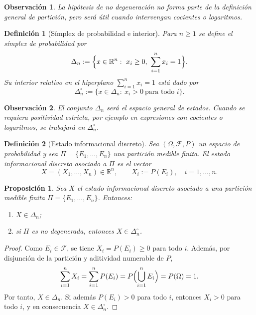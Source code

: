 \documentclass[12pt]{article}
\newtheorem{definicion}{Definición}[section]
\newtheorem{proposicion}{Proposición}[section]
\newtheorem{observacion}{Observación}[section]
\begin{document}
\begin{observacion}
La hipótesis de no degeneración no forma parte de la definición general de partición, pero será útil cuando intervengan cocientes o logaritmos.
\end{observacion}

\begin{definicion}[Símplex de probabilidad e interior]\label{def:simplex}
Para $n\ge 1$ se define el \emph{símplex de probabilidad} por
\[
\Delta_n:=\Bigl\{x\in\mathbb R^n:\ x_i\ge 0,\ \sum_{i=1}^n x_i=1\Bigr\}.
\]
Su interior relativo en el hiperplano $\sum_{i=1}^n x_i=1$ está dado por
\[
\Delta_n^\circ:=\{x\in\Delta_n:\ x_i>0\ \text{para todo } i\}.
\]
\end{definicion}

\begin{observacion}
El conjunto $\Delta_n$ será el espacio general de estados. Cuando se requiera positividad estricta, por ejemplo en expresiones con cocientes o logaritmos, se trabajará en $\Delta_n^\circ$.
\end{observacion}

\begin{definicion}[Estado informacional discreto]\label{def:estado}
Sea $(\Omega,\mathcal F,P)$ un espacio de probabilidad y sea $\Pi=\{E_1,\dots,E_n\}$ una partición medible finita. El \emph{estado informacional discreto} asociado a $\Pi$ es el vector
\[
X=(X_1,\dots,X_n)\in\mathbb R^n,
\qquad
X_i:=P(E_i),\quad i=1,\dots,n.
\]
\end{definicion}

\begin{proposicion}\label{prop:estado_simplex}
Sea $X$ el estado informacional discreto asociado a una partición medible finita $\Pi=\{E_1,\dots,E_n\}$.
Entonces:
\begin{enumerate}
    \item $X\in\Delta_n$;
    \item si $\Pi$ es no degenerada, entonces $X\in\Delta_n^\circ$.
\end{enumerate}
\end{proposicion}

\begin{proof}
Como $E_i\in\mathcal F$, se tiene $X_i=P(E_i)\ge 0$ para todo $i$. Además, por disjunción de la partición y aditividad numerable de $P$,
\[
\sum_{i=1}^n X_i
=
\sum_{i=1}^n P(E_i)
=
P\Bigl(\bigcup_{i=1}^n E_i\Bigr)
=
P(\Omega)
=
1.
\]
Por tanto, $X\in\Delta_n$. Si además $P(E_i)>0$ para todo $i$, entonces $X_i>0$ para todo $i$, y en consecuencia $X\in\Delta_n^\circ$.
\end{proof}
\end{document}
